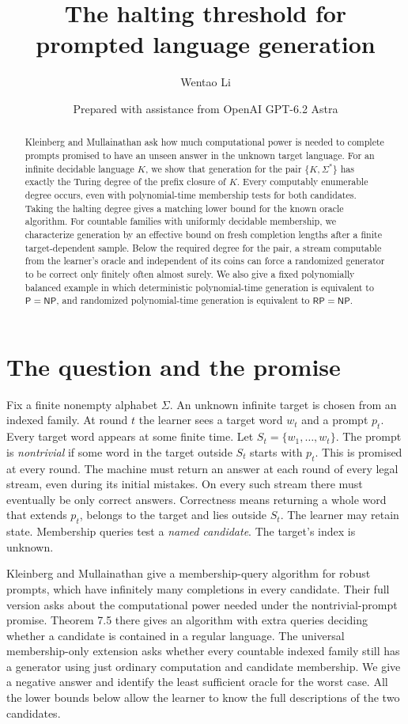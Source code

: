 \documentclass[11pt]{article}
\title{The halting threshold for prompted language generation}
\author{Wentao Li}
\date{\small Prepared with assistance from OpenAI GPT-6.2 Astra}
\newcommand{\NP}{\mathsf{NP}}
\newcommand{\RP}{\mathsf{RP}}
\newcommand{\PT}{\mathsf P}
\begin{document}
\maketitle
\begin{abstract}
Kleinberg and Mullainathan ask how much computational power is needed to complete prompts promised to have an unseen answer in the unknown target language. For an infinite decidable language $K$, we show that generation for the pair $\{K,\Sigma^*\}$ has exactly the Turing degree of the prefix closure of $K$. Every computably enumerable degree occurs, even with polynomial-time membership tests for both candidates. Taking the halting degree gives a matching lower bound for the known oracle algorithm. For countable families with uniformly decidable membership, we characterize generation by an effective bound on fresh completion lengths after a finite target-dependent sample. Below the required degree for the pair, a stream computable from the learner's oracle and independent of its coins can force a randomized generator to be correct only finitely often almost surely. We also give a fixed polynomially balanced example in which deterministic polynomial-time generation is equivalent to $\PT=\NP$, and randomized polynomial-time generation is equivalent to $\RP=\NP$.
\end{abstract}

\section{The question and the promise}
Fix a finite nonempty alphabet $\Sigma$. An unknown infinite target is chosen from an indexed family. At round $t$ the learner sees a target word $w_t$ and a prompt $p_t$. Every target word appears at some finite time. Let $S_t=\{w_1,\dots,w_t\}$. The prompt is \emph{nontrivial} if some word in the target outside $S_t$ starts with $p_t$. This is promised at every round. The machine must return an answer at each round of every legal stream, even during its initial mistakes. On every such stream there must eventually be only correct answers. Correctness means returning a whole word that extends $p_t$, belongs to the target and lies outside $S_t$. The learner may retain state. Membership queries test a \emph{named candidate}. The target's index is unknown.

Kleinberg and Mullainathan \cite[Theorem 7.1]{kmconf} give a membership-query algorithm for robust prompts, which have infinitely many completions in every candidate. Their full version \cite[Section 7.2]{km} asks about the computational power needed under the nontrivial-prompt promise. Theorem 7.5 there gives an algorithm with extra queries deciding whether a candidate is contained in a regular language. The universal membership-only extension asks whether every countable indexed family still has a generator using just ordinary computation and candidate membership. We give a negative answer and identify the least sufficient oracle for the worst case. All the lower bounds below allow the learner to know the full descriptions of the two candidates.
\end{document}
